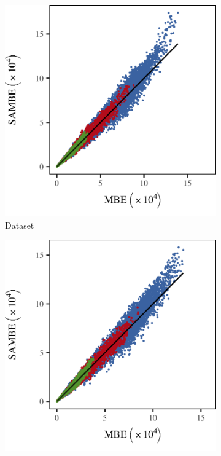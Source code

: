 		\begin{figure}
			\centering
			\begin{subfigure}{0.3\textwidth}
				\centering
				\includegraphics[keepaspectratio=true, width=\textwidth, height=0.23\textheight]{discussion/img/ferdosi_2_60000_mbe_sambe.png}
				\caption{Dataset \ferdosiTwo}
				\label{fig:discussion:performance:mbevssambe:ferdosi2}
			\end{subfigure}
			\begin{subfigure}{0.3\textwidth}
				\centering
				\includegraphics[keepaspectratio=true, width=\textwidth, height=0.23\textheight]{discussion/img/baakman_2_60000_mbe_sambe.png}

\end{subfigure}
\end{figure}
